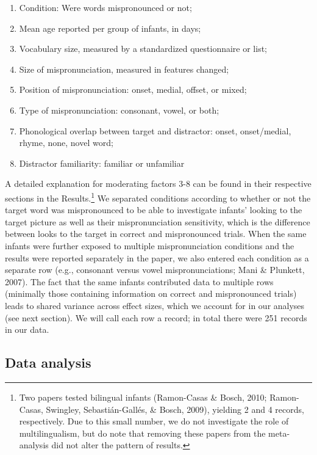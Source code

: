 \documentclass[man]{apa6}
\providecommand{\tightlist}{%
  \setlength{\itemsep}{0pt}\setlength{\parskip}{0pt}}
\let\rmarkdownfootnote\footnote%
\def\footnote{\protect\rmarkdownfootnote}
\begin{document}
\begin{enumerate}
\def\labelenumi{\arabic{enumi}.}
\tightlist
\item
  Condition: Were words mispronounced or not;
\item
  Mean age reported per group of infants, in days;
\item
  Vocabulary size, measured by a standardized questionnaire or list;
\item
  Size of mispronunciation, measured in features changed;
\item
  Position of mispronunciation: onset, medial, offset, or mixed;
\item
  Type of mispronunciation: consonant, vowel, or both;
\item
  Phonological overlap between target and distractor: onset, onset/medial, rhyme, none, novel word;
\item
  Distractor familiarity: familiar or unfamiliar
\end{enumerate}

A detailed explanation for moderating factors 3-8 can be found in their respective sections in the Results.\footnote{Two papers tested bilingual infants (Ramon-Casas \& Bosch, 2010; Ramon-Casas, Swingley, Sebastián-Gallés, \& Bosch, 2009), yielding 2 and 4 records, respectively. Due to this small number, we do not investigate the role of multilingualism, but do note that removing these papers from the meta-analysis did not alter the pattern of results.} We separated conditions according to whether or not the target word was mispronounced to be able to investigate infants' looking to the target picture as well as their mispronunciation sensitivity, which is the difference between looks to the target in correct and mispronounced trials. When the same infants were further exposed to multiple mispronunciation conditions and the results were reported separately in the paper, we also entered each condition as a separate row (e.g., consonant versus vowel mispronunciations; Mani \& Plunkett, 2007). The fact that the same infants contributed data to multiple rows (minimally those containing information on correct and mispronounced trials) leads to shared variance across effect sizes, which we account for in our analyses (see next section). We will call each row a record; in total there were 251 records in our data.

\hypertarget{data-analysis}{%
\subsection{Data analysis}\label{data-analysis}}
\end{document}
